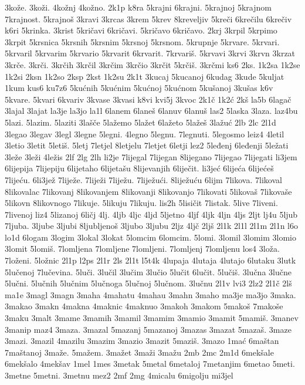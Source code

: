 {3kože.
3koži.
4kožnj
4kožno.
2k1p
k8ra
5krajni
6krajni.
5krajnoj
5krajnom
7krajnost.
5krajnoš
3kravi
3krcas
3krem
5krev
8kreveljiv
5kreči
6krečilu
6krečiv
k6ri
5krinka.
3krist
5kričavi
6kričavi.
5kričavo
6kričavo.
2krj
3krpil
5krpimo
3krpit
5krsnica
5krsnih
5krsnim
5krsnoj
5krsnom.
5krupnje
5krvare.
5krvari.
5krvaril
5krvarim
5krvario
5krvarit
6krvarit.
7krvariš.
5krvavi
3krvi
3krvn
3krzat
3krče.
3krči.
3krčih
3krčil
3krčim
3krčio
3krčit
5krčiš.
3krčmi
ks6
2ks.
1k2sa
1k2se
1k2si
2ksn
1k2so
2ksp
2kst
1k2su
2k1t
3kucaj
5kucanoj
6kudag
3kude
5kuljat
1kum
kus6
ku7z6
5kućnih
5kućnim
5kućnoj
5kućnom
5kušanoj
3kušas
k6v
5kvare.
5kvari
6kvariv
3kvase
3kvasi
k8vi
kvi5j
3kvoc
2k1č
1k2ć
2kš
la5b
6lagač
3lajal
3lajat
la3je
la3jo
la1l
6lanem
6laneš
6lanuv
6lanuš
las2
5laska
3laza.
laz4bu
5lazi.
5lazim.
5laziti
3lašče
5lažemo
5lažet
6lažeto
5lažeš
3lažuć
2lb
2lc
2l1d
3legao
3legav
3legl
3legne
5legni.
4legno
5legnu.
7legnuti.
5legosmo
leiz4
4letil
3letio
3letit
5letiš.
5letj
7letjel
8letjelu
7letjet
6letji
lez2
5leđenj
6leđenji
5ležati
3leže
3leži
4ležis
2lf
2lg
2lh
li2je
7lijegal
7lijegan
8lijegano
7lijegao
7lijegati
li3jem
6lijepija
7lijepiju
6lijetaho
6lijetašu
8lijevanjih
6liječit.
li3jeć
6lijeća
6lijećeš
7lijeću.
6li3jež
7liježe.
7liježi
7liježu.
7liježući.
8liježuću
6lijm
7likova.
7likoval
8likovalac
7likovanj
8likovanjem
8likovanji
8likovanjo
7likovati
5likovaš
7likovaše
5likovn
8likovnogo
7likuje.
5likuju
7likuju.
lis2h
5lisičit
7listak.
5live
7liveni.
7livenoj
liz4
5lizanoj
6ličj
4lj.
4ljb
4ljc
4ljd
5ljetno
4ljf
4ljk
4ljn
4ljs
2ljt
lj4u
5ljub
7ljuba.
3ljube
3ljubi
8ljubljenoš
3ljubo
3ljubu
2ljz
4ljč
2ljš
2l1k
2l1l
2l1m
2l1n
l6o
lo1d
6logam
3logim
3lokal
3lokat
5lomcim
6lomcim.
5lomi.
3lomil
3lomim
3lomio
3lomit
5lomiš.
7lomljena
7lomljene
7lomljeni.
7lomljenj
7lomljenu
los4
3loža.
7loženi.
5ložnic
2l1p
l2ps
2l1r
2ls
2l1t
l5t4k
4lupaja
4lutaja
4lutajo
6lutaku
3lutk
5lučenoj
7lučevina.
5luči.
3lučil
3lučim
3lučio
5lučit
6lučit.
5lučiš.
3lučna
3lučne
5lučni.
5lučnih
5lučnim
5lučnoga
5lučnoj
5lučnom.
3lučnu
2l1v
lvi3
2lz2
2l1č
2lš
ma1e
3magl
3magn
3maha
4mahatu
4mahau
3mahn
3maho
ma3je
ma3jo
3maka.
3makao
3makn
4makna
4maknic
4maknuo
3makoh
3makom
5makoš
7makoše
3maku
3malt
3mame
3mamih
3mamil
3mamim
3mamio
3mamit
5mamiš.
3manev
3manip
maz4
3maza.
3mazal
5mazanj
5mazanoj
3mazas
3mazat
5mazaš.
3maze
3mazi.
3mazil
4mazilu
3mazim
3mazio
3mazit
5maziš.
3mazo
1mać
6maštan
7maštanoj
3maže.
5mažem.
3mažet
3maži
3mažu
2mb
2mc
2m1d
6mekšale
6mekšalo
4mekšav
1mel
1mes
3metak
5metal
6metaloj
7metanjim
6metao
5meti.
3metne
5metni.
3metnu
mez2
2mf
2mg
4micalu
6migolju
mi3jel
}
